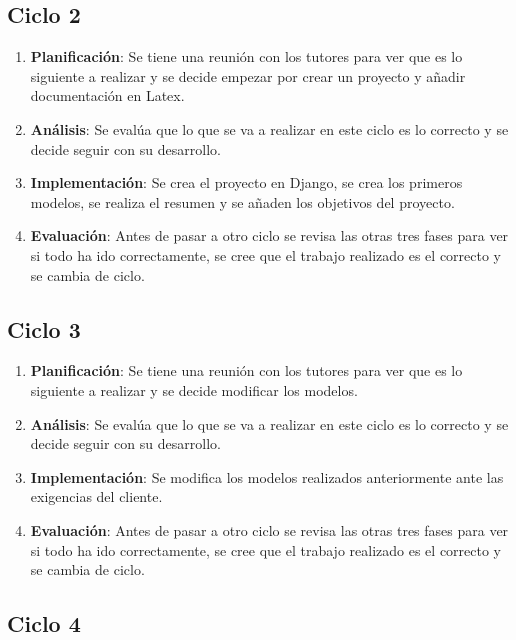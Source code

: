 \subsection{Ciclo 2}

\begin{enumerate}
	\item \textbf{Planificación}: Se tiene una reunión con los tutores para ver que es lo siguiente a realizar y se decide empezar por crear un proyecto y añadir documentación en Latex\cite{Latex}.
	\item \textbf{Análisis}: Se evalúa que lo que se va a realizar en este ciclo es lo correcto y se decide seguir con su desarrollo.
	\item \textbf{Implementación}: Se crea el proyecto en Django\cite{Django}, se crea los primeros modelos, se realiza el resumen y se añaden los objetivos del proyecto.
	\item \textbf{Evaluación}: Antes de pasar a otro ciclo se revisa las otras tres fases para ver si todo ha ido correctamente, se cree que el trabajo realizado es el correcto y se cambia de ciclo.
\end{enumerate}

\subsection{Ciclo 3}

\begin{enumerate}
	\item \textbf{Planificación}: Se tiene una reunión con los tutores para ver que es lo siguiente a realizar y se decide modificar los modelos.
	\item \textbf{Análisis}: Se evalúa que lo que se va a realizar en este ciclo es lo correcto y se decide seguir con su desarrollo.
	\item \textbf{Implementación}: Se modifica los modelos realizados anteriormente ante las exigencias del cliente.
	\item \textbf{Evaluación}: Antes de pasar a otro ciclo se revisa las otras tres fases para ver si todo ha ido correctamente, se cree que el trabajo realizado es el correcto y se cambia de ciclo.
\end{enumerate}

\subsection{Ciclo 4}

